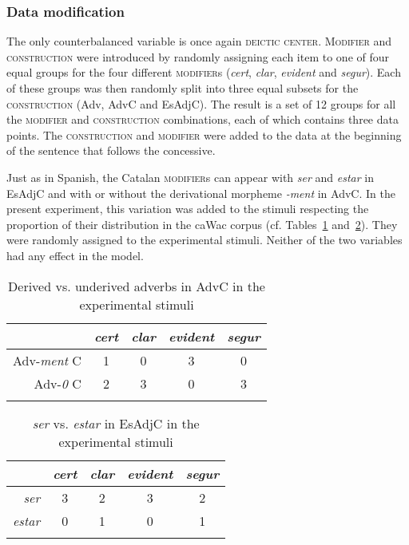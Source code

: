 \subsubsection{Data modification}\largerpage
The only counterbalanced variable   is once again \textsc{deictic center}. \textsc{Modifier} and \textsc{construction} were introduced by randomly assigning  each item to one of four equal groups for the four different \textsc{modifier}s (\textit{cert}, \textit{clar}, \textit{evident} and \textit{segur}). Each of these groups was then randomly split into three equal subsets for the \textsc{construction} (Adv, AdvC and EsAdjC). The result is a set of 12 groups for all the \textsc{modifier} and \textsc{construction} combinations,  each of which contains three data points. The  \textsc{construction} and \textsc{modifier} were  added to the data at the beginning of the sentence that follows the concessive. 

Just as in Spanish,  the Catalan \textsc{modifier}s can appear with \textit{ser} and \textit{estar} in EsAdjC and with or without the derivational morpheme \textit{-ment} in AdvC. In the present experiment, this variation was added to the stimuli respecting the proportion of their distribution in the caWac corpus (cf. Tables~\ref{tab:catesser} and~\ref{tab:catment}). They were randomly assigned to the experimental stimuli. Neither of the two variables had any effect in the model.

\begin{table}
\begin{tabular}{rcccc}
	\lsptoprule
	& \textit{cert} & \textit{clar} & \textit{evident} & \textit{segur} \\\midrule
	Adv-\textit{ment} C  & 1 & 0 & 3 & 0 \\ 
	Adv-\textit{0} C & 2 & 3 & 0 & 3 \\
	\lspbottomrule
\end{tabular}
\caption{Derived vs. underived adverbs in AdvC in the experimental stimuli  \label{tab:catesser}}
\end{table}

\begin{table}
	\begin{tabular}{rcccc}
	\lsptoprule
	& \textit{cert} & \textit{clar} & \textit{evident} & \textit{segur}\\\midrule
	\textit{ser} & 3 & 2 & 3 & 2 \\ 
	\textit{estar} & 0 & 1 & 0 & 1 \\ 
	\lspbottomrule
	\end{tabular}
\caption{\textit{ser} vs. \textit{estar} in EsAdjC in the experimental stimuli\label{tab:catment}}
\end{table}


